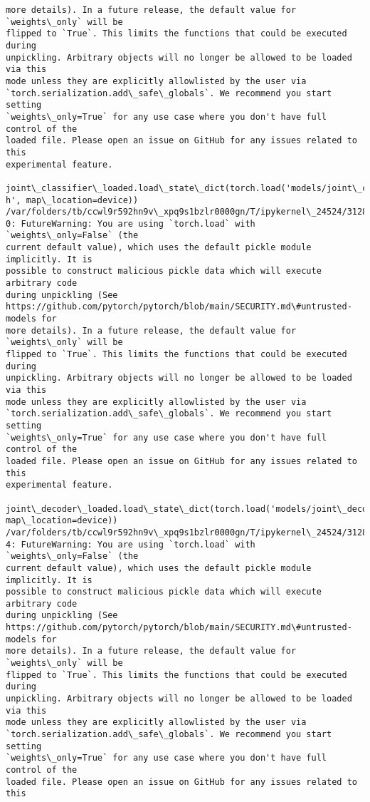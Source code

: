 \documentclass[11pt]{article}
\begin{document}
\begin{Verbatim}[commandchars=\\\{\}]
more details). In a future release, the default value for `weights\_only` will be
flipped to `True`. This limits the functions that could be executed during
unpickling. Arbitrary objects will no longer be allowed to be loaded via this
mode unless they are explicitly allowlisted by the user via
`torch.serialization.add\_safe\_globals`. We recommend you start setting
`weights\_only=True` for any use case where you don't have full control of the
loaded file. Please open an issue on GitHub for any issues related to this
experimental feature.
  joint\_classifier\_loaded.load\_state\_dict(torch.load('models/joint\_classifier.pt
h', map\_location=device))
/var/folders/tb/ccwl9r592hn9v\_xpq9s1bzlr0000gn/T/ipykernel\_24524/3128444424.py:1
0: FutureWarning: You are using `torch.load` with `weights\_only=False` (the
current default value), which uses the default pickle module implicitly. It is
possible to construct malicious pickle data which will execute arbitrary code
during unpickling (See
https://github.com/pytorch/pytorch/blob/main/SECURITY.md\#untrusted-models for
more details). In a future release, the default value for `weights\_only` will be
flipped to `True`. This limits the functions that could be executed during
unpickling. Arbitrary objects will no longer be allowed to be loaded via this
mode unless they are explicitly allowlisted by the user via
`torch.serialization.add\_safe\_globals`. We recommend you start setting
`weights\_only=True` for any use case where you don't have full control of the
loaded file. Please open an issue on GitHub for any issues related to this
experimental feature.
  joint\_decoder\_loaded.load\_state\_dict(torch.load('models/joint\_decoder.pth',
map\_location=device))
/var/folders/tb/ccwl9r592hn9v\_xpq9s1bzlr0000gn/T/ipykernel\_24524/3128444424.py:1
4: FutureWarning: You are using `torch.load` with `weights\_only=False` (the
current default value), which uses the default pickle module implicitly. It is
possible to construct malicious pickle data which will execute arbitrary code
during unpickling (See
https://github.com/pytorch/pytorch/blob/main/SECURITY.md\#untrusted-models for
more details). In a future release, the default value for `weights\_only` will be
flipped to `True`. This limits the functions that could be executed during
unpickling. Arbitrary objects will no longer be allowed to be loaded via this
mode unless they are explicitly allowlisted by the user via
`torch.serialization.add\_safe\_globals`. We recommend you start setting
`weights\_only=True` for any use case where you don't have full control of the
loaded file. Please open an issue on GitHub for any issues related to this

\end{Verbatim}
\end{document}
